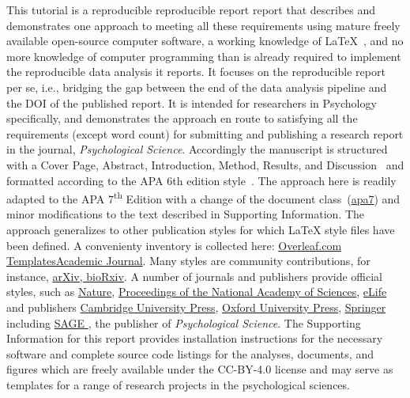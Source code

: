 \documentclass[helv,10pt,man,floatsintext]{apa6}  %
\begin{document}
This tutorial is a reproducible reproducible report report that
describes and demonstrates one approach to meeting all these
requirements using mature freely available open-source computer
software, a working knowledge of \LaTeX{}~\cite{latexproject}, and no more knowledge of
computer programming than is already required to implement the
reproducible data analysis it reports. It focuses on the reproducible
report per se, i.e., bridging the gap between the end of the data
analysis pipeline and the DOI of the published report. It is intended
for researchers in Psychology specifically, and demonstrates the
approach en route to satisfying all the requirements (except word
count) for submitting and publishing a research report in the journal,
{\it Psychological Science}. Accordingly the manuscript is structured
with a Cover Page, Abstract, Introduction, Method, Results, and
Discussion~\parencite{APSStructStyle} and formatted according to the
APA 6th edition style~\parencite{APAStyle6th}. The approach here is
readily adapted to the APA 7\textsuperscript{th} Edition with a change
of the document
class~({\href{https://www.overleaf.com/project/5f3053af0af0dc00016f191b}{apa7}})
and minor modifications to the text described in Supporting
Information. The approach generalizes to other
publication styles for which \LaTeX{} style files have been defined.
A convenienty inventory is collected here:
\href{https://www.overleaf.com/latex/templates/tagged/academic-journal}{Overleaf.com
  Templates\textemdash Academic Journal}. Many styles are community
contributions, for instance,
\href{https://www.overleaf.com/latex/templates/tagged/arxiv}{arXiv,
  bioRxiv}.
%
A number of journals and publishers provide official styles, such as
%
\href{https://www.overleaf.com/latex/templates/tagged/npg}{Nature},
\href{https://www.overleaf.com/latex/templates/tagged/pnas}{Proceedings of the National Academy of Sciences},
\href{https://www.overleaf.com/latex/templates/tagged/elife-official}{eLife}
%
and publishers
%
\href{https://www.overleaf.com/latex/templates/tagged/cup-official}{Cambridge University Press},
\href{https://www.overleaf.com/latex/templates/oup-general-template/fqkhysbcbpwv}{Oxford University Press},
\href{https://www.overleaf.com/latex/templates/tagged/springer}{Springer}
%
including 
%
\href{
  https://www.overleaf.com/latex/templates/a-demonstration-of-the-latex2e-class-file-for-sage-publications/jcdyknyjrkzb
}{
  SAGE
},
%
the publisher of {\em Psychological Science}.
%
The Supporting Information for this report provides installation
instructions for the necessary software and complete source code
listings for the analyses, documents, and figures which are freely
available under the CC-BY-4.0 license and may serve as templates for
a range of research projects in the psychological sciences.
\end{document}
